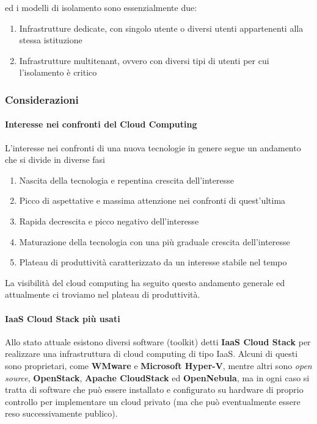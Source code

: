 ed i modelli di isolamento sono essenzialmente due:

\begin{enumerate}
\def\labelenumi{\arabic{enumi}.}
\tightlist
\item
  Infrastrutture dedicate, con singolo utente o diversi utenti
  appartenenti alla stessa istituzione
\item
  Infrastrutture multitenant, ovvero con diversi tipi di utenti per cui
  l'isolamento è critico
\end{enumerate}

\subsubsection{Considerazioni}\label{considerazioni}

\paragraph{Interesse nei confronti del Cloud
Computing}\label{interesse-nei-confronti-del-cloud-computing}

L'interesse nei confronti di una nuova tecnologie in genere segue un
andamento che si divide in diverse fasi

\begin{enumerate}
\def\labelenumi{\arabic{enumi}.}
\tightlist
\item
  Nascita della tecnologia e repentina crescita dell'interesse
\item
  Picco di aspettative e massima attenzione nei confronti di
  quest'ultima
\item
  Rapida decrescita e picco negativo dell'interesse
\item
  Maturazione della tecnologia con una più graduale crescita
  dell'interesse
\item
  Plateau di produttività caratterizzato da un interesse stabile nel
  tempo
\end{enumerate}

La visibilità del cloud computing ha seguito questo andamento generale
ed attualmente ci troviamo nel plateau di produttività.

\paragraph{IaaS Cloud Stack più
usati}\label{iaas-cloud-stack-piuxf9-usati}

Allo stato attuale esistono diversi software (toolkit) detti
\textbf{IaaS Cloud Stack} per realizzare una infrastruttura di cloud
computing di tipo IaaS. Alcuni di questi sono proprietari, come
\textbf{WMware} e \textbf{Microsoft Hyper-V}, mentre altri sono
\emph{open source}, \textbf{OpenStack}, \textbf{Apache CloudStack} ed
\textbf{OpenNebula}, ma in ogni caso si tratta di software che può
essere installato e configurato su hardware di proprio controllo per
implementare un cloud privato (ma che può eventualmente essere reso
successivamente publico).

